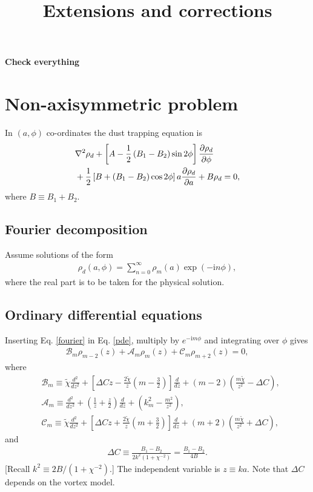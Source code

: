 \documentclass[12pt]{article} %
\title{Extensions and corrections}
\begin{document}
\maketitle
{\bf Check everything}
\section{Non-axisymmetric problem}
In $(a,\phi)$ co-ordinates the dust trapping equation is
\begin{align}\label{pde}
&\nabla^2\rho_d + \left[A - \frac{1}{2}\left(B_1-B_2\right)\sin{2\phi}\right]\frac{\partial\rho_d}{\partial\phi}\notag\\
&+\frac{1}{2}\left[B+\left(B_1-B_2\right)\cos{2\phi}\right]a\frac{\partial\rho_d}{\partial a} + B\rho_d = 0,
\end{align}
where $B\equiv B_1 + B_2$. 
\subsection{Fourier decomposition}
Assume solutions of the form
\begin{align}\label{fourier}
\rho_d(a,\phi) = \sum_{n=0}^\infty\rho_m(a)\exp{(-\mathrm{i}n\phi)},	
\end{align}
where the real part is to be taken for the physical solution. 	

\subsection{Ordinary differential equations}
Inserting Eq. \ref{fourier} in Eq. \ref{pde}, multiply by $e^{-\mathrm{i}m\phi}$ and integrating over $\phi$ gives 
\begin{align}\label{ode}
\mathcal{B}_m\rho_{m-2} (z)+ \mathcal{A}_m\rho_m(z) + \mathcal{C}_m\rho_{m+2}(z) = 0,
\end{align}
where
\begin{align}
&\mathcal{B}_m \equiv \tilde{\chi}\frac{d^2}{dz^2} + \left[\Delta C z - \frac{2\tilde{\chi}}{z}\left(m-\frac{3}{2}\right)\right]
\frac{d}{dz} + \left(m-2\right)\left(\frac{m\tilde{\chi}}{z^2} -\Delta C\right),\\
&\mathcal{A}_m\equiv\frac{d^2}{dz^2} + \left(\frac{1}{z}+\frac{z}{2}\right)\frac{d}{dz} + \left(k_m^2-\frac{m^2}{z^2}\right),\\
&\mathcal{C}_m \equiv \tilde{\chi}\frac{d^2}{dz^2} + \left[\Delta C z + \frac{2\tilde{\chi}}{z}\left(m+\frac{3}{2}\right)\right]
\frac{d}{dz} + \left(m+2\right)\left(\frac{m\tilde{\chi}}{z^2} +\Delta C\right),
\end{align}
and
\begin{align}
\Delta C \equiv \frac{B_1-B_2}{2k^2(1+\chi^{-2})} = \frac{B_1 - B_2}{4B}.
\end{align}
[Recall $k^2\equiv 2B/\left(1+\chi^{-2}\right)$.] The independent variable is $z\equiv ka$. Note that $\Delta C$ depends on the vortex model. 
\end{document}
